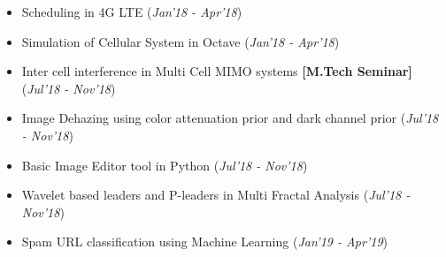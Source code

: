 \documentclass[10pt]{article}
\begin{document}
\colorbox{bl}{}
\vspace{-0.5cm}
\begin{itemize}[leftmargin=0.4cm]


	
\item {Scheduling in 4G LTE }
\hfill{(\textit{Jan'18 - Apr'18})}\\
\vspace{-0.7cm}
	
	
\item {Simulation of Cellular System in Octave}
\hfill{(\textit{Jan'18 - Apr'18})}\\
\vspace{-0.7cm}

\item {Inter cell interference in Multi Cell MIMO systems 
} \textbf{[M.Tech Seminar]}
\hfill{(\textit{Jul'18 - Nov'18})}\\
\vspace{-0.7cm}

\item {Image Dehazing using color attenuation prior and dark channel prior 
} \hfill{(\textit{Jul'18 - Nov'18})}\\
\vspace{-0.7cm}

\item {Basic Image Editor tool in Python 
} 
\hfill{(\textit{Jul'18 - Nov'18})}\\
\vspace{-0.7cm}

\item {Wavelet based leaders and P-leaders in Multi
Fractal Analysis} 
\hfill{(\textit{Jul'18 - Nov'18})}\\
\vspace{-0.7cm}

\item {Spam URL classification using Machine Learning}
\hfill{(\textit{Jan'19 - Apr'19})}\\
\vspace{-0.5cm}



\end{itemize}
\end{document}
